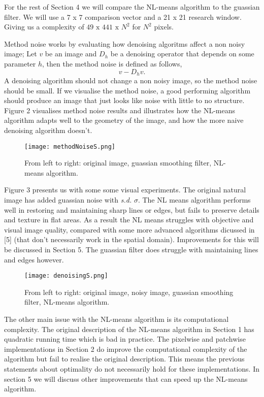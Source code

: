 \documentclass[11pt, twocolumn]{article}
\begin{document}
For the rest of Section 4 we will compare the NL-means algorithm to the guassian filter. We will use a  7 x 7 comparison vector and a 21 x 21 research window. Giving us a complexity of $49 \text{ x } 441 \text{ x } N^2$ for $N^2$ pixels. 

Method noise works by evaluating how denoising algoritms affect a non noisy image; Let $v$ be an image and $D_h$ be a denoising operator that depends on some parameter $h$, then the method noise is defined as follows,
$$v - D_h v.$$
A denoising algorithm should not change a non noisy image, so the method noise should be small. If we visualise the method noise, a good performing algorithm should produce an image that just looks like noise with little to no structure. Figure 2 visualises method noise results and illustrates how the NL-means algorithm adapts well to the geometry of the image, and how the more naive denoising algorithm doesn't.
\begin{figure}[h]
\texttt{[image: methodNoiseS.png]}
\caption{From left to right: original image, guassian smoothing filter, NL-means algorithm.}
\end{figure}
Figure 3 presents us with some some visual experiments. The original natural image has added guassian noise with \textit{s.d.} $\sigma$. The NL means algorithm performs well in restoring and maintaining sharp lines or edges, but fails to preserve details and texture in flat areas. As a result the NL means struggles with objective and visual image quality, compared with some more advanced algorithms dicussed in [5] (that don't necessarily work in the spatial domain). Improvements for this will be discussed in Section 5. The guassian filter does struggle with maintaining lines and edges however.
\begin{figure}[h]
\texttt{[image: denoisingS.png]}
\caption{From left to right: original image, noisy image, guassian smoothing filter, NL-means algorithm.}
\end{figure}

The other main issue with the NL-means algorithm is its computational complexity. The original description of the NL-means algorithm in Section 1 has quadratic running time which is bad in practice. The pixelwise and patchwise implementations in Section 2 do improve the computational complexity of the algorithm but fail to realise the original description. This means the previous statements about optimality do not necessarily hold for these implementations. In section 5 we will discuss other improvements that can speed up the NL-means algorithm.
\end{document}
